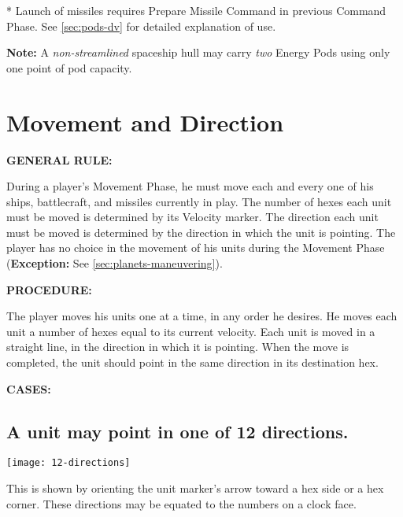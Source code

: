 \begin{table}[htbp]
{\begin{minipage}{6in}
      \medskip

      \parbox{\textwidth}{* Launch of missiles requires Prepare
        Missile Command in previous Command  
        Phase. See \ref{sec:pods-dv} for detailed explanation of use.}
      
      \parbox{\textwidth}{\textbf{Note:} A \emph{non-streamlined}
        spaceship hull may carry \emph{two} Energy Pods using only one
        point of pod capacity.\label{sec:add-two-energy}}
    \end{minipage}}
\end{table}

\section{Movement and Direction}
\label{sec:movement-direction}

\noindent\textbf{GENERAL RULE:}

During a player's Movement Phase, he must move each and every one of
his ships, battlecraft, and missiles currently in play. The number of
hexes each unit must be moved is determined by its Velocity marker.
The direction each unit must be moved is determined by the direction
in which the unit is pointing. The player has no choice in the
movement of his units during the Movement Phase (\textbf{Exception:}
See \ref{sec:planets-maneuvering}).

\medskip

\noindent\textbf{PROCEDURE:}

The player moves his units one at a time, in any order he desires. He
moves each unit a number of hexes equal to its current velocity.  Each
unit is moved in a straight line, in the direction in which it is
pointing. When the move is completed, the unit should point in the
same direction in its destination hex.

\medskip

\noindent\textbf{CASES:}


\subsection[Direction]{A unit may point in one of 12 directions.}
\label{sec:direction}

\begin{center}
  \texttt{[image: 12-directions]}
\end{center}


This is shown by orienting the unit marker's arrow toward a hex side
or a hex corner. These directions may be equated to the numbers on a
clock face.


